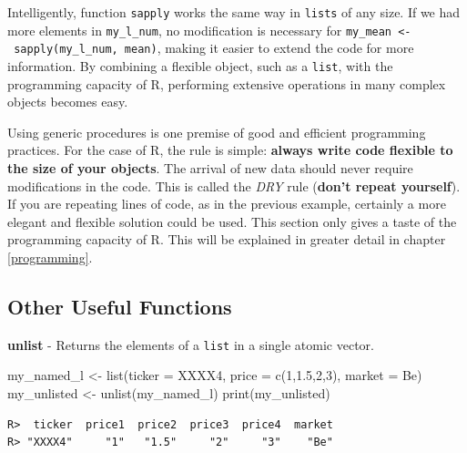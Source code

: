 \documentclass[
  12pt,
]{book}
\newenvironment{Shaded}{\begin{snugshade}}{\end{snugshade}}
\newcommand{\AttributeTok}[1]{\textcolor[rgb]{0.61,0.61,0.61}{#1}}
\newcommand{\DecValTok}[1]{\textcolor[rgb]{0.06,0.06,0.06}{#1}}
\newcommand{\FloatTok}[1]{\textcolor[rgb]{0.06,0.06,0.06}{#1}}
\newcommand{\FunctionTok}[1]{\textcolor[rgb]{0,0,0}{#1}}
\newcommand{\NormalTok}[1]{#1}
\newcommand{\OtherTok}[1]{\textcolor[rgb]{0.37,0.37,0.37}{#1}}
\newcommand{\StringTok}[1]{\textcolor[rgb]{0.5,0.5,0.5}{#1}}
\begin{document}
Intelligently, function \texttt{sapply} works the same way in \texttt{lists} of any size. If we had more elements in \texttt{my\_l\_num}, no modification is necessary for \texttt{my\_mean\ \textless{}-\ sapply(my\_l\_num,\ mean)}, making it easier to extend the code for more information. By combining a flexible object, such as a \texttt{list}, with the programming capacity of R, performing extensive operations in many complex objects becomes easy.

Using generic procedures is one premise of good and efficient programming practices. For the case of R, the rule is simple: \textbf{always write code flexible to the size of your objects}. The arrival of new data should never require modifications in the code. This is called the \emph{DRY} rule (\textbf{don't repeat yourself}). If you are repeating lines of code, as in the previous example, certainly a more elegant and flexible solution could be used. This section only gives a taste of the programming capacity of R. This will be explained in greater detail in chapter \ref{programming}.

\hypertarget{other-useful-functions}{%
\subsection{Other Useful Functions}\label{other-useful-functions}}

\textbf{unlist} - Returns the elements of a \texttt{list} in a single atomic vector. 

\begin{Shaded}
\begin{Highlighting}[]
\NormalTok{my\_named\_l }\OtherTok{\textless{}{-}} \FunctionTok{list}\NormalTok{(}\AttributeTok{ticker =} \StringTok{\textquotesingle{}XXXX4\textquotesingle{}}\NormalTok{,}
                   \AttributeTok{price =} \FunctionTok{c}\NormalTok{(}\DecValTok{1}\NormalTok{,}\FloatTok{1.5}\NormalTok{,}\DecValTok{2}\NormalTok{,}\DecValTok{3}\NormalTok{),}
                   \AttributeTok{market =} \StringTok{\textquotesingle{}Be\textquotesingle{}}\NormalTok{)}
\NormalTok{my\_unlisted }\OtherTok{\textless{}{-}} \FunctionTok{unlist}\NormalTok{(my\_named\_l)}
\FunctionTok{print}\NormalTok{(my\_unlisted)}
\end{Highlighting}
\end{Shaded}

\begin{verbatim}
R>  ticker  price1  price2  price3  price4  market 
R> "XXXX4"     "1"   "1.5"     "2"     "3"    "Be"
\end{verbatim}
\end{document}
